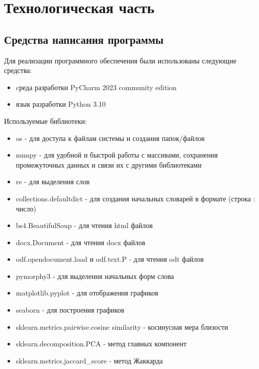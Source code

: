 \chapter{Технологическая часть}

\section{Средства написания программы}
Для реализации программного обеспечения были использованы следующие средства:

\begin{itemize}
    \item cреда разработки PyCharm 2023 community edition \cite{lib:pycharm}
    \item язык разработки Python 3.10 \cite{lib:python}
\end{itemize}
	
Используемые библиотеки:
\begin{itemize}
    \item 
    os - для доступа к файлам системы и создания папок/файлов \cite{lib:os}
    \item 
    numpy - для удобной и быстрой работы с массивами, сохранения промежуточных данных и связи их с другими библиотеками \cite{lib:numpy}
    \item 
    re - для выделения слов \cite{lib:re}
    \item 
    collections.defaultdict - для создания начальных словарей в формате (строка : число) \cite{lib:defaultdict}
    \item 
    bs4.BeautifulSoup - для чтения html файлов \cite{lib:bs4}
    \item 
    docx.Document - для чтения docx файлов \cite{lib:docx}
    \item 
    odf.opendocument.load и odf.text.P - для чтения odt файлов \cite{lib:odf}
    \item 
    pymorphy3 - для выделения начальных форм слова \cite{lib:pymorphy3}
    \item 
    matplotlib.pyplot - для отображения графиков \cite{lib:matplotlib}
    \item 
    seaborn - для построения графиков \cite{lib:seaborn}
    \item 
    sklearn.metrics.pairwise.cosine similarity - косинусная мера близости \cite{lib:sklearn}
    \item 
    sklearn.decomposition.PCA - метод главных компонент \cite{lib:sklearn}
    \item 
    sklearn.metrics.jaccard\_score - метод Жаккарда \cite{lib:sklearn}
\end{itemize}

